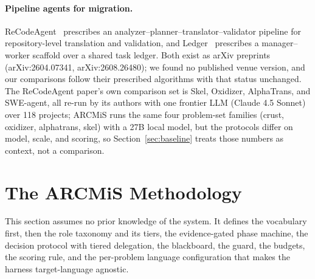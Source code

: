 \documentclass[11pt]{article}
\begin{document}
\paragraph{Pipeline agents for migration.}
ReCodeAgent~\cite{recodeagent2026} prescribes an
analyzer--planner--translator--validator pipeline for repository-level
translation and validation, and Ledger~\cite{ledger2026} prescribes a
manager--worker scaffold over a shared task ledger. Both exist as arXiv
preprints (arXiv:2604.07341, arXiv:2608.26480); we found no published
venue version, and our comparisons follow their prescribed algorithms
with that status unchanged. The ReCodeAgent paper's own comparison
set is Skel, Oxidizer, AlphaTrans, and SWE-agent, all re-run by its
authors with one frontier LLM (Claude 4.5 Sonnet) over 118 projects;
ARCMiS runs the same four problem-set families (crust, oxidizer,
alphatrans, skel) with a 27B local model, but the protocols differ on
model, scale, and scoring, so Section~\ref{sec:baseline} treats those
numbers as context, not a comparison.

\section{The ARCMiS Methodology}
\label{sec:method}

This section assumes no prior knowledge of the system. It defines the
vocabulary first, then the role taxonomy and its tiers, the
evidence-gated phase machine, the decision protocol with tiered
delegation, the blackboard, the guard, the budgets, the scoring rule,
and the per-problem language configuration that makes the harness
target-language agnostic.
\end{document}
